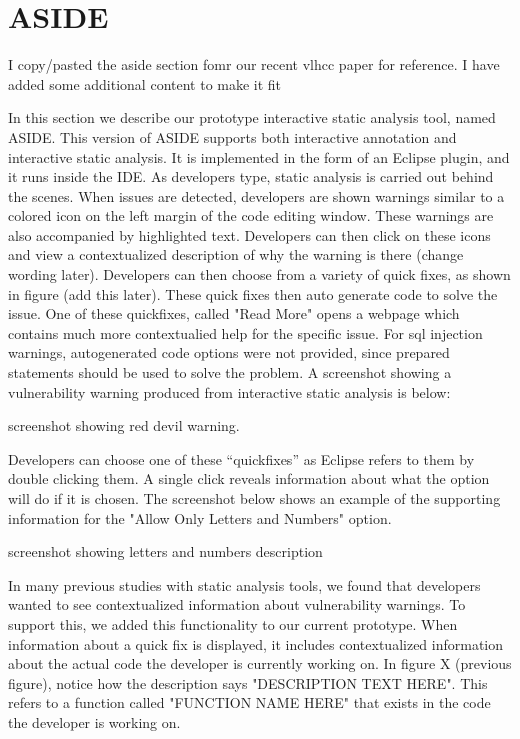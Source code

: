 \documentclass[twoside,letterpaper]{soups}
\begin{document}
\section{ASIDE}
I copy/pasted the aside section fomr our recent vlhcc paper for reference. I have added some additional content to make it fit


In this section we describe our prototype interactive static analysis tool, named ASIDE. This version of ASIDE supports both interactive annotation and interactive static analysis. It is implemented in the form of an Eclipse plugin, and it runs inside the IDE. As developers type, static analysis is carried out behind the scenes. When issues are detected, developers are shown warnings similar to a colored icon on the left margin of the code editing window. These warnings are also accompanied by highlighted text. Developers can then click on these icons and view a contextualized description of why the warning is there (change wording later). Developers can then choose from a variety of quick fixes, as shown in figure (add this later). These quick fixes then auto generate code to solve the issue. One of these quickfixes, called "Read More" opens a webpage which contains much more contextualied help for the specific issue. For sql injection warnings, autogenerated code options were not provided, since prepared statements should be used to solve the problem. A screenshot showing a vulnerability warning produced from interactive static analysis is below:

screenshot showing red devil warning. 

Developers can choose one of these ``quickfixes'' as Eclipse refers to them by double clicking them. A single click reveals information about what the option will do if it is chosen. The screenshot below shows an example of the supporting information for the "Allow Only Letters and Numbers" option.

screenshot showing letters and numbers description

In many previous studies with static analysis tools, we found that developers wanted to see contextualized information about vulnerability warnings. To support this, we added this functionality to our current prototype. When information about a quick fix is displayed, it includes contextualized information about the actual code the developer is currently working on. In figure X (previous figure), notice how the description says "DESCRIPTION TEXT HERE". This refers to a function called "FUNCTION NAME HERE" that exists in the code the developer is working on.
\end{document}
